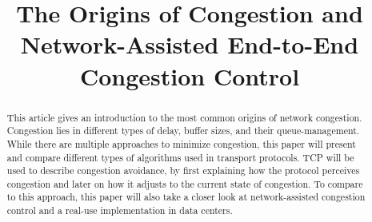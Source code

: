 \documentclass[a4paper,conference]{IEEEtran}
\begin{document}
\title{The Origins of Congestion and\\Network-Assisted End-to-End Congestion Control}


\author{
}


\maketitle
\IEEEpeerreviewmaketitle

\begin{abstract}
This article gives an introduction to the most common origins of network congestion. Congestion lies in different types of delay, buffer sizes, and their queue-management. While there are multiple approaches to minimize congestion, this paper will present and compare different types of algorithms used in transport protocols. TCP will be used to describe congestion avoidance, by first explaining how the protocol perceives congestion and later on how it adjusts to the current state of congestion. To compare to this approach, this paper will also take a closer look at network-assisted congestion control and a real-use implementation in data centers.
\end{abstract}
\end{document}
